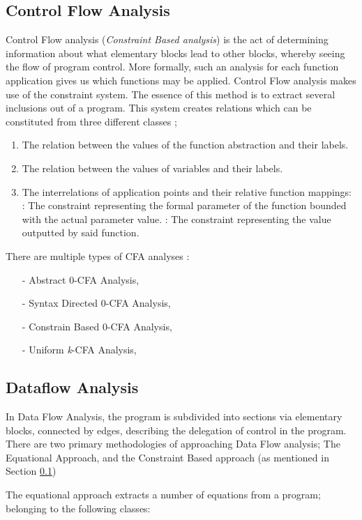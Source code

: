		\subsection{Control Flow Analysis}
		\label{subsec:cfa}
		\par Control Flow analysis (\textit{Constraint Based analysis}) is the act of determining information about what elementary blocks lead to other blocks, whereby seeing the flow of program control. More formally, such an analysis for each 
		function application gives us which functions may be applied. Control Flow analysis makes use of the constraint system. The essence of this method is to extract several inclusions out of a program. This system creates relations which can be 
		constituted from three different classes \cite[pp.10--13]{nielson2004principlesofPA};
		\begin{enumerate}
			\item The relation between the values of the function abstraction and their labels.
			\item The relation between the values of variables and their labels.
			\item The interrelations of application points and their relative function mappings:
				: The constraint representing the formal parameter of the function bounded with the actual parameter value.
				: The constraint representing the value outputted by said function.
		\end{enumerate}
		\par There are multiple types of CFA analyses \cite[pp.139--195]{nielson2004principlesofPA}:
		\begin{itemize}
			\item[-] Abstract 0-CFA Analysis,
			\item[-] Syntax Directed 0-CFA Analysis,
			\item[-] Constrain Based 0-CFA Analysis,
			\item[-] Uniform \textit{k}-CFA Analysis,
		\end{itemize}
		
		\subsection{Dataflow Analysis}
		\label{subsec:dfa}
		\par In Data Flow Analysis, the program is subdivided into sections via elementary blocks, connected by edges, describing the delegation of control in the program.
		There are two primary methodologies of approaching Data Flow analysis; The Equational Approach, and the Constraint Based approach (as mentioned in Section \ref{subsec:cfa})
		\par The equational approach extracts a number of equations from a program; belonging to the following classes:
				
